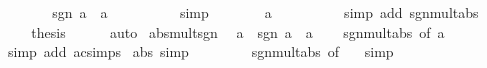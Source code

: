\begin{isabellebody}
\ \ \ \ \isamarkupfalse%
\ \isamarkupfalse%
\ {\isachardoublequoteopen}sgn\ a\ {\isacharasterisk}{\kern0pt}\ {\isasymbar}a{\isasymbar}\ {\isacharequal}{\kern0pt}\ {}{\isachardoublequoteclose}\isanewline
\ \ \ \ \ \ \isamarkupfalse%
\ simp\isanewline
\ \ \ \ \isamarkupfalse%
\ \isamarkupfalse%
\ {\isachardoublequoteopen}a\ {\isacharequal}{\kern0pt}\ {}{\isachardoublequoteclose}\isanewline
\ \ \ \ \ \ \isamarkupfalse%
\ {\isacharparenleft}{\kern0pt}simp\ add{\isacharcolon}{\kern0pt}\ sgn{\isacharunderscore}{\kern0pt}mult{\isacharunderscore}{\kern0pt}abs{\isacharparenright}{\kern0pt}\isanewline
\ \ \isacommand{{\isacharbraceright}{\kern0pt}}\isamarkupfalse%
\ \isamarkupfalse%
\ \isamarkupfalse%
\ {\isacharquery}{\kern0pt}thesis\isanewline
\ \ \ \ \isamarkupfalse%
\ auto\isanewline
{}\isamarkupfalse%
%
\endisatagproof
{\isafoldproof}%
%
\isadelimproof
\isanewline
%
\endisadelimproof
\isanewline
{}\isamarkupfalse%
\ abs{\isacharunderscore}{\kern0pt}mult{\isacharunderscore}{\kern0pt}sgn{\isacharcolon}{\kern0pt}\isanewline
\ \ {\isachardoublequoteopen}{\isasymbar}a{\isasymbar}\ {\isacharasterisk}{\kern0pt}\ sgn\ a\ {\isacharequal}{\kern0pt}\ a{\isachardoublequoteclose}\isanewline
%
\isadelimproof
\ \ %
\endisadelimproof
%
\isatagproof
{}\isamarkupfalse%
\ sgn{\isacharunderscore}{\kern0pt}mult{\isacharunderscore}{\kern0pt}abs\ {\isacharbrackleft}{\kern0pt}of\ a{\isacharbrackright}{\kern0pt}\ \isamarkupfalse%
\ {\isacharparenleft}{\kern0pt}simp\ add{\isacharcolon}{\kern0pt}\ ac{\isacharunderscore}{\kern0pt}simps{\isacharparenright}{\kern0pt}%
\endisatagproof
{\isafoldproof}%
%
\isadelimproof
\isanewline
%
\endisadelimproof
\isanewline
{}\isamarkupfalse%
\ abs{\isacharunderscore}{\kern0pt}{}\ {\isacharbrackleft}{\kern0pt}simp{\isacharbrackright}{\kern0pt}{\isacharcolon}{\kern0pt}\isanewline
\ \ {\isachardoublequoteopen}{\isasymbar}{}{\isasymbar}\ {\isacharequal}{\kern0pt}\ {}{\isachardoublequoteclose}\isanewline
%
\isadelimproof
\ \ %
\endisadelimproof
%
\isatagproof
{}\isamarkupfalse%
\ sgn{\isacharunderscore}{\kern0pt}mult{\isacharunderscore}{\kern0pt}abs\ {\isacharbrackleft}{\kern0pt}of\ {}{\isacharbrackright}{\kern0pt}\ \isamarkupfalse%
\ simp%
\endisatagproof
{\isafoldproof}%
%
\isadelimproof
\isanewline
%
\endisadelimproof
\isanewline
{}\isamarkupfalse%

\end{isabellebody}
